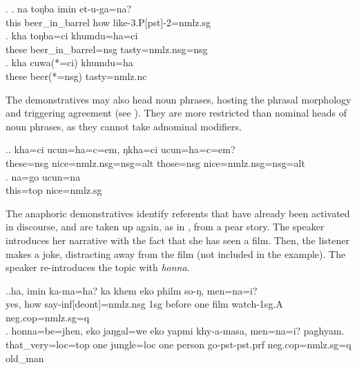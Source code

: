 \ex. \ag. 	na toŋba imin et-u-ga=na?\\
			this beer\_in\_barrel how like{\sc -3.P[pst]-2=nmlz.sg}\\
			\bg.	kha toŋba=ci khumdu=ha=ci\\
			these beer\_in\_barrel{\sc =nsg} tasty{\sc =nmlz.nsg=nsg}\\
			\bg.	kha cuwa(*=ci) khumdu=ha\\
			these beer{\sc (*=nsg)} tasty{\sc =nmlz.nc}\\
				
The demonstratives may also head noun phrases, hosting the phrasal morphology and triggering agreement (see \Next). They are more restricted than nominal heads of noun phrases, as they cannot take adnominal modifiers.  
			
	\ex.\ag.	kha=ci ucun=ha=c=em, ŋkha=ci ucun=ha=c=em?\\
			these{\sc =nsg} nice{\sc =nmlz.nsg=nsg=alt} those{\sc =nsg} nice{\sc =nmlz.nsg=nsg=alt}\\ 
	\bg. 	na=go ucun=na\\
			this{\sc =top} nice{\sc =nmlz.sg}\\

			
The anaphoric demonstratives identify referents that have already been activated in discourse, and are taken up again, as in \Next, from a pear story. The speaker introduces her narrative with the fact that she has seen a film. Then, the listener makes a joke, distracting away from the film (not included in the example).  The speaker re-introduces the topic with \emph{honna}.

\ex.\ag.ha,    imin ka-ma=ha? ka       khem    eko philm so-ŋ, men=na=i?\\
yes, how say{\sc -inf[deont]=nmlz.nsg}  {\sc 1sg} before one film watch{\sc [3.P;pst]-1sg.A} {\sc neg.cop=nmlz.sg=q}\\
\bg. honna=be=jhen,  eko jaŋgal=we    eko yapmi  khy-a-masa,    men=na=i?    paghyam.\\
that\_very{\sc =loc=top} one jungle{\sc =loc} one person go{\sc [3sg]-pst-pst.prf} {\sc neg.cop=nmlz.sg=q} old\_man \\
  

